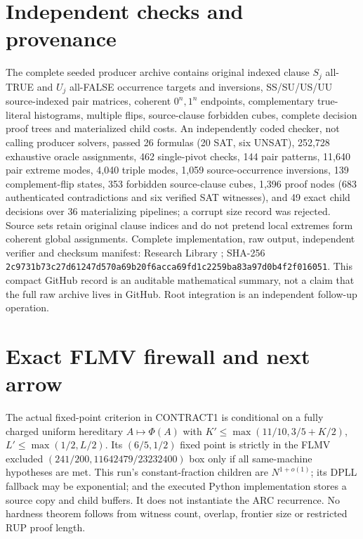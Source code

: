 \documentclass[11pt]{article}
\begin{document}
\section{Independent checks and provenance}
The complete seeded producer archive contains original indexed clause $S_j$ all-TRUE and $U_j$ all-FALSE occurrence targets and inversions, SS/SU/US/UU source-indexed pair matrices, coherent $0^n,1^n$ endpoints, complementary true-literal histograms, multiple flips, source-clause forbidden cubes, complete decision proof trees and materialized child costs. An independently coded checker, not calling producer solvers, passed 26 formulas (20 SAT, six UNSAT), 252,728 exhaustive oracle assignments, 462 single-pivot checks, 144 pair patterns, 11,640 pair extreme modes, 4,040 triple modes, 1,059 source-occurrence inversions, 139 complement-flip states, 353 forbidden source-clause cubes, 1,396 proof nodes (683 authenticated contradictions and six verified SAT witnesses), and 49 exact child decisions over 36 materializing pipelines; a corrupt size record was rejected. Source sets retain original clause indices and do not pretend local extremes form coherent global assignments.
Complete implementation, raw output, independent verifier and checksum manifest: Research Library
;
SHA-256 \texttt{2c9731b73c27d61247d570a69b20f6acca69fd1c2259ba83a97d0b4f2f016051}.
This compact GitHub record is an auditable mathematical summary, not a claim that the full raw archive lives in GitHub. Root integration is an independent follow-up operation.
\section{Exact FLMV firewall and next arrow}
The actual fixed-point criterion in CONTRACT1 is conditional on a fully charged uniform hereditary $A\mapsto\Phi(A)$ with $K'\le\max(11/10,3/5+K/2)$, $L'\le\max(1/2,L/2)$. Its $(6/5,1/2)$ fixed point is strictly in the FLMV excluded $(241/200,11642479/23232400)$ box only if all same-machine hypotheses are met. This run's constant-fraction children are $N^{1+o(1)}$; its DPLL fallback may be exponential; and the executed Python implementation stores a source copy and child buffers. It does not instantiate the ARC recurrence. No hardness theorem follows from witness count, overlap, frontier size or restricted RUP proof length.
\end{document}
